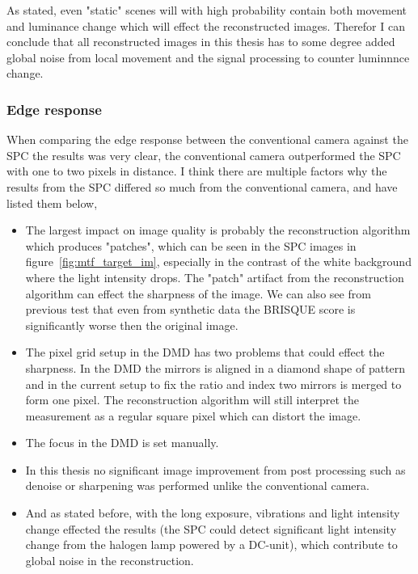 As stated, even "static" scenes will with high probability contain both movement and luminance change which will effect the reconstructed images. Therefor I can conclude that all reconstructed images in this thesis has to some degree added global noise from local movement and the signal processing to counter luminnnce change.


\subsubsection{Edge response}
When comparing the edge response between the conventional camera against the SPC the results was very clear, the conventional camera outperformed the SPC with one to two pixels in distance. I think there are multiple factors why the results from the SPC differed so much from the conventional camera, and have listed them below,

\begin{itemize}
\item The largest impact on image quality is probably the reconstruction algorithm which produces "patches", which can be seen in the SPC images in figure~\ref{fig:mtf_target_im}, especially in the contrast of the white background where the light intensity drops. The "patch" artifact from the reconstruction algorithm can effect the sharpness of the image. We can also see from previous test that even from synthetic data the BRISQUE score is significantly worse then the original image.

\item The pixel grid setup in the DMD has two problems that could effect the sharpness. In the DMD the mirrors is aligned in a diamond shape of pattern and in the current setup to fix the ratio and index two mirrors is merged to form one pixel. The reconstruction algorithm will still interpret the measurement as a regular square pixel which can distort the image.

\item The focus in the DMD is set manually.

\item In this thesis no significant image improvement from post processing such as denoise or sharpening was performed unlike the conventional camera.

\item And as stated before, with the long exposure, vibrations and light intensity change effected the results (the SPC could detect significant light intensity change from the halogen lamp powered by a DC-unit), which contribute to global noise in the reconstruction.

\end{itemize}



